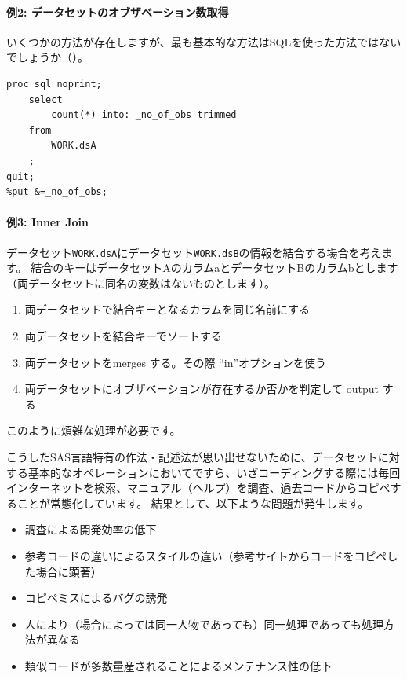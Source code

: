 \paragraph{例2: データセットのオブザベーション数取得}
いくつかの方法が存在しますが、最も基本的な方法はSQLを使った方法ではないでしょうか（）。
\begin{lstlisting}[language=SAS, caption={データセットのオブザベーション数取得}, label={code:get_count}, breaklines = true]
proc sql noprint;
	select
		count(*) into: _no_of_obs trimmed
	from
		WORK.dsA
	;
quit;
%put &=_no_of_obs;
\end{lstlisting}
 
\paragraph{例3: Inner Join}
データセット\texttt{WORK.dsA}にデータセット\texttt{WORK.dsB}の情報を結合する場合を考えます。
結合のキーはデータセットAのカラムaとデータセットBのカラムbとします（両データセットに同名の変数はないものとします）。
 
\begin{enumerate}
\item 両データセットで結合キーとなるカラムを同じ名前にする
\item 両データセットを結合キーでソートする
\item 両データセットをmerges する。その際 ``in''オプションを使う
\item 両データセットにオブザベーションが存在するか否かを判定して output する
\end{enumerate}
このように煩雑な処理が必要です。
 
こうしたSAS言語特有の作法・記述法が思い出せないために、データセットに対する基本的なオペレーションにおいてですら、いざコーディングする際には毎回インターネットを検索、マニュアル（ヘルプ）を調査、過去コードからコピペすることが常態化しています。
結果として、以下ような問題が発生します。
\begin{itemize}
\item 調査による開発効率の低下
\item 参考コードの違いによるスタイルの違い（参考サイトからコードをコピペした場合に顕著）
\item コピペミスによるバグの誘発
\item 人により（場合によっては同一人物であっても）同一処理であっても処理方法が異なる
\item 類似コードが多数量産されることによるメンテナンス性の低下
\end{itemize}
 
